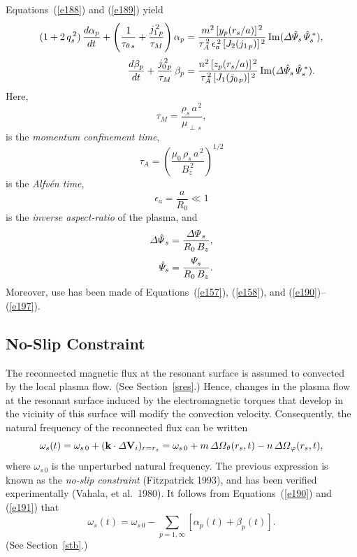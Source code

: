 \documentclass[notitlepage,12pt]{article}
\begin{document}
Equations~(\ref{e188}) and (\ref{e189}) yield
\begin{align}\label{e198}
(1+2\,q_s^{\,2})\,\frac{d\alpha_p}{dt} + \left(\frac{1}{\tau_{\theta\,s}}+\frac{j_{1\,p}^{\,2}}{\tau_{M}}\right)\alpha_p
&= \frac{m^{2}\,[y_p(r_s/a)]^{\,2}}{\tau_A^{\,2}\,\epsilon_a^{\,2}\,[J_2(j_{1\,p})]^{\,2}}\,
{\rm Im}({\mit\Delta\hat{\Psi}_s}\,\hat{\mit\Psi}_s^{\,\ast}),\\[0.5ex]
\frac{d\beta_p}{dt} + \frac{j_{0\,p}^{\,2}}{\tau_{M}}\,\beta_p
&= \frac{n^{2}\,[z_p(r_s/a)]^{\,2}}{\tau_A^{\,2}\,[J_1(j_{0\,p})]^{\,2}}\,
{\rm Im}({\mit\Delta\hat{\Psi}_s}\,\hat{\mit\Psi}_s^{\,\ast}).\label{e199}
\end{align}
Here, 
\begin{equation}
\tau_{M} =\frac{\rho_s\,a^{\,2}}{\mu_{\perp\,s}},
\end{equation} 
is the {\em momentum confinement time}, 
\begin{equation}
\tau_A = \left(\frac{\mu_0\,\rho_s\,a^{\,2}}{B_z^{\,2}}\right)^{1/2}
\end{equation}
 is the {\em Alfv\'{e}n time}, 
 \begin{equation}
 \epsilon_a=\frac{a}{R_0}\ll 1
 \end{equation}
 is the {\em inverse aspect-ratio}\/ of the plasma, and
 \begin{align}
{\mit\Delta\hat{\Psi}}_s &=\frac{{\mit\Delta\Psi}_s}{R_0\,B_z},\label{e204}\\[0.5ex]
 \hat{\mit\Psi}_s &=\frac{{\mit\Psi}_s}{R_0\,B_z}.
 \end{align}
  Moreover,
use has been made of Equations~(\ref{e157}), (\ref{e158}), and (\ref{e190})--(\ref{e197}). 

\subsection{No-Slip Constraint}\label{sns}
The reconnected magnetic flux at the resonant surface is assumed to convected by the local plasma flow. (See Section~\ref{sres}.) Hence, changes in the
plasma flow at the resonant surface induced by the electromagnetic torques that develop in the vicinity of this
surface will modify the convection velocity. Consequently, the natural frequency of the reconnected flux can be written
\begin{equation}\label{e200}
 \omega_s(t) = \omega_{s\,0} + ({\bf k}\cdot {\mit\Delta}{\bf V}_i)_{r=r_s}=
 \omega_{s\,0} + m\,{\mit\Delta\Omega}_\theta(r_s,t) - n\,{\mit\Delta\Omega}_\varphi(r_s,t),
\end{equation}
where $\omega_{s\,0}$ is the unperturbed natural frequency. The previous expression is known as the {\em no-slip constraint}\/ (Fitzpatrick 1993), and has been verified experimentally (Vahala, et al.\ 1980). 
It follows from Equations~(\ref{e190})
and (\ref{e191}) that
\begin{equation}\label{e201}
\omega_s(t) = \omega_{s\,0} - \sum_{p=1,\infty}\left[\alpha_p(t)+\beta_p(t)\right].
\end{equation}
(See Section~\ref{stb}.)
\end{document}
